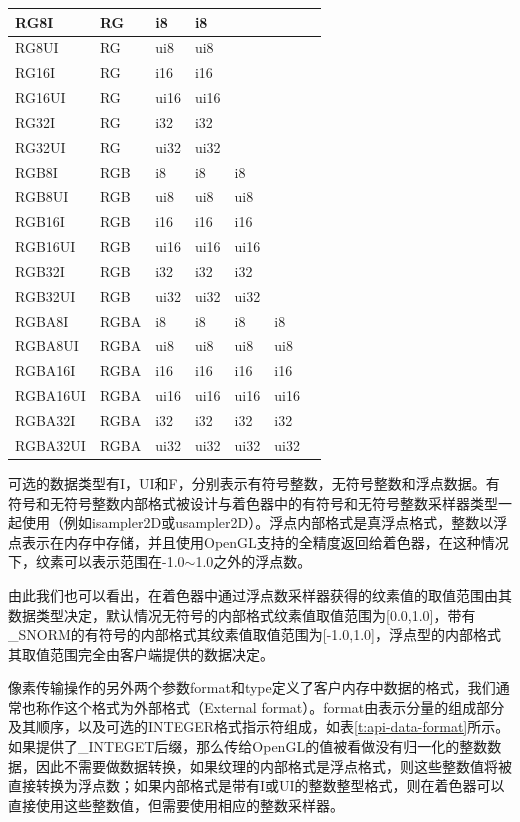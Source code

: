 \begin{longtable}{>{\small}p{}|>{\small}p{}|>{\small}p{}|>{\small}p{}|>{\small}p{}|>{\small}p{}|>{\small}p{}}
  RG8I          & RG & i8 & i8 & & &\\\hline
  RG8UI         & RG & ui8 & ui8 & & &\\\hline
  RG16I         & RG & i16 & i16& & &\\\hline
  RG16UI        & RG & ui16& ui16& & &\\\hline
  RG32I         & RG & i32 & i32 & & &\\\hline
  RG32UI        & RG &  ui32 & ui32& & &\\\hline
  
  RGB8I          & RGB & i8 & i8 & i8 & &\\\hline
  RGB8UI         & RGB & ui8 & ui8 & ui8 & &\\\hline
  RGB16I         & RGB & i16 & i16& i16& &\\\hline
  RGB16UI        & RGB & ui16& ui16& ui16& &\\\hline
  RGB32I         & RGB & i32 & i32 & i32& &\\\hline
  RGB32UI        & RGB & ui32 & ui32& ui32& &\\\hline
  
  RGBA8I          & RGBA & i8 & i8 & i8 & i8 &\\\hline
  RGBA8UI         & RGBA & ui8 & ui8 & ui8 & ui8 &\\\hline
  RGBA16I         & RGBA & i16 & i16& i16& i16 &\\\hline
  RGBA16UI        & RGBA & ui16& ui16& ui16& ui16&\\\hline
  RGBA32I         & RGBA & i32 & i32 & i32& i32&\\\hline
  RGBA32UI        & RGBA & ui32 & ui32& ui32& ui32&\\

 \hline 
\end{longtable}

可选的数据类型有I，UI和F，分别表示有符号整数，无符号整数和浮点数据。有符号和无符号整数内部格式被设计与着色器中的有符号和无符号整数采样器类型一起使用（例如isampler2D或usampler2D）。浮点内部格式是真浮点格式，整数以浮点表示在内存中存储，并且使用OpenGL支持的全精度返回给着色器，在这种情况下，纹素可以表示范围在-1.0$\sim$1.0之外的浮点数。

由此我们也可以看出，在着色器中通过浮点数采样器获得的纹素值的取值范围由其数据类型决定，默认情况无符号的内部格式纹素值取值范围为[0.0,1.0]，带有\_SNORM的有符号的内部格式其纹素值取值范围为[-1.0,1.0]，浮点型的内部格式其取值范围完全由客户端提供的数据决定。

像素传输操作的另外两个参数format和type定义了客户内存中数据的格式，我们通常也称作这个格式为外部格式（External format）。format由表示分量的组成部分及其顺序，以及可选的INTEGER格式指示符组成，如表\ref{t:api-data-format}所示。如果提供了\_INTEGET后缀，那么传给OpenGL的值被看做没有归一化的整数数据，因此不需要做数据转换，如果纹理的内部格式是浮点格式，则这些整数值将被直接转换为浮点数；如果内部格式是带有I或UI的整数整型格式，则在着色器可以直接使用这些整数值，但需要使用相应的整数采样器。

